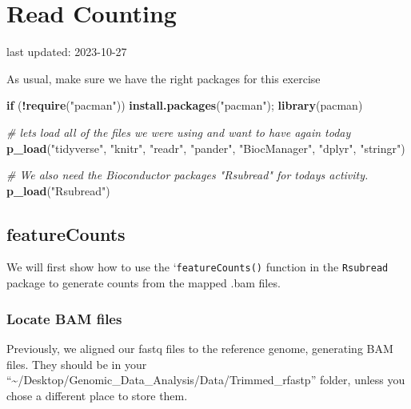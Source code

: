 \documentclass[
]{book}
\newenvironment{Shaded}{\begin{snugshade}}{\end{snugshade}}
\newcommand{\CommentTok}[1]{\textcolor[rgb]{0.56,0.35,0.01}{\textit{#1}}}
\newcommand{\ControlFlowTok}[1]{\textcolor[rgb]{0.13,0.29,0.53}{\textbf{#1}}}
\newcommand{\FunctionTok}[1]{\textcolor[rgb]{0.13,0.29,0.53}{\textbf{#1}}}
\newcommand{\NormalTok}[1]{#1}
\newcommand{\SpecialCharTok}[1]{\textcolor[rgb]{0.81,0.36,0.00}{\textbf{#1}}}
\newcommand{\StringTok}[1]{\textcolor[rgb]{0.31,0.60,0.02}{#1}}
\begin{document}
\hypertarget{read-counting}{%
\chapter{Read Counting}\label{read-counting}}

last updated: 2023-10-27

As usual, make sure we have the right packages for this exercise

\begin{Shaded}
\begin{Highlighting}[]
\ControlFlowTok{if}\NormalTok{ (}\SpecialCharTok{!}\FunctionTok{require}\NormalTok{(}\StringTok{"pacman"}\NormalTok{)) }\FunctionTok{install.packages}\NormalTok{(}\StringTok{"pacman"}\NormalTok{); }\FunctionTok{library}\NormalTok{(pacman)}

\CommentTok{\# let\textquotesingle{}s load all of the files we were using and want to have again today}
\FunctionTok{p\_load}\NormalTok{(}\StringTok{"tidyverse"}\NormalTok{, }\StringTok{"knitr"}\NormalTok{, }\StringTok{"readr"}\NormalTok{,}
       \StringTok{"pander"}\NormalTok{, }\StringTok{"BiocManager"}\NormalTok{, }
       \StringTok{"dplyr"}\NormalTok{, }\StringTok{"stringr"}\NormalTok{)}

\CommentTok{\# We also need the Bioconductor packages "Rsubread" for today\textquotesingle{}s activity.}
\FunctionTok{p\_load}\NormalTok{(}\StringTok{"Rsubread"}\NormalTok{)}
\end{Highlighting}
\end{Shaded}

\hypertarget{featurecounts}{%
\section{featureCounts}\label{featurecounts}}

We will first show how to use the `\texttt{featureCounts()} function in the \texttt{Rsubread} package to generate counts from the mapped .bam files.

\hypertarget{locate-bam-files}{%
\subsection{Locate BAM files}\label{locate-bam-files}}

Previously, we aligned our fastq files to the reference genome, generating BAM files. They should be in your ``\textasciitilde/Desktop/Genomic\_Data\_Analysis/Data/Trimmed\_rfastp'' folder, unless you chose a different place to store them.
\end{document}
